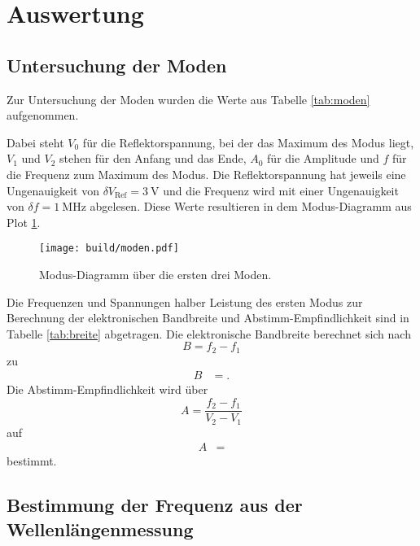 \section{Auswertung}
\label{sec:Auswertung}


\subsection{Untersuchung der Moden}

Zur Untersuchung der Moden wurden die Werte aus Tabelle \ref{tab:moden} aufgenommen.

Dabei steht $V_0$ für die Reflektorspannung, bei der das Maximum des Modus liegt, $V_1$ und $V_2$ stehen für den Anfang und das Ende, $A_0$ für die Amplitude und $f$ für die Frequenz zum Maximum des Modus.
Die Reflektorspannung hat jeweils eine Ungenauigkeit von $\delta V_\text{Ref} = \SI{3}{\volt}$ und die Frequenz wird mit einer Ungenauigkeit von $\delta f = \SI{1}{\mega\hertz}$ abgelesen.
Diese Werte resultieren in dem Modus-Diagramm aus Plot \ref{plot:modus}.
\begin{figure}
  \centering
  \texttt{[image: build/moden.pdf]}
  \caption{Modus-Diagramm über die ersten drei Moden.}
  \label{plot:modus}
\end{figure}
Die Frequenzen und Spannungen halber Leistung des ersten Modus zur Berechnung der elektronischen Bandbreite und Abstimm-Empfindlichkeit sind in Tabelle \ref{tab:breite} abgetragen.
Die elektronische Bandbreite berechnet sich nach
\begin{equation}
  B = f_2-f_1
\end{equation}
zu
\begin{align*}
  B &= .
\end{align*}
Die Abstimm-Empfindlichkeit wird über
\begin{equation}
  A = \frac{f_2-f_1}{V_2-V_1}
\end{equation}
auf
\begin{align*}
  A &= 
\end{align*}
bestimmt.

\subsection{Bestimmung der Frequenz aus der Wellenlängenmessung}

